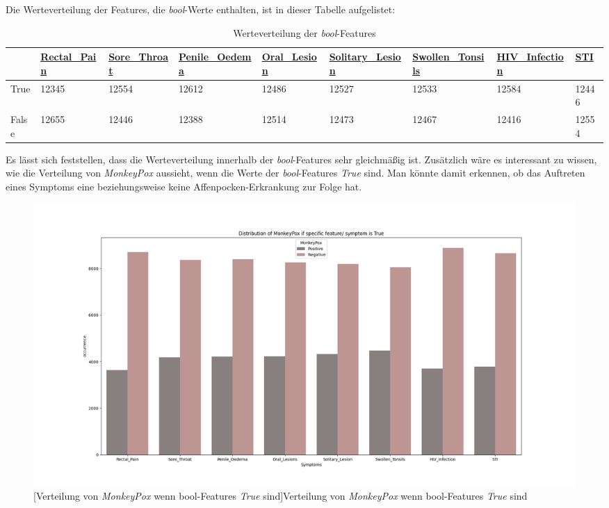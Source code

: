 \documentclass[13pt,a4paper, listof=entryprefix, bibliography=totocnumbered,toc=listofnumbered,lof=listofnumbered]{scrartcl}
\begin{document}
Die Werteverteilung der Features, die \textit{bool}-Werte enthalten, ist in dieser Tabelle aufgelistet: 
	
	\begin{singlespace}
	\begin{table}[H]
		\begin{adjustbox}{width=1\textwidth}
			\small
		\begin{tabular}{|l|l|l|l|l|l|l|l|l|}
			\hline  & \url{Rectal_Pain}&  \url{Sore_Throat}	& \url{Penile_Oedema} & \url{Oral_Lesion} & \url{Solitary_Lesion} &\url{Swollen_Tonsils} & \url{HIV_Infection} & \url{STI} \\
			\hline True & 12345 & 12554 & 12612 & 12486 & 12527 & 12533 & 12584  & 12446 \\
			\hline False & 12655 & 12446 & 12388& 12514 & 12473 & 12467 & 12416 & 12554\\
			\hline
		\end{tabular}
	\end{adjustbox}
		\caption{Werteverteilung der \textit{bool}-Features} %
		\label{tab:werteverteilung_features}
	\end{table}
\end{singlespace}
	

Es lässt sich feststellen, dass die Werteverteilung innerhalb der \textit{bool}-Features sehr gleichmäßig ist. 
Zusätzlich wäre es interessant zu wissen, wie die Verteilung von \textit{MonkeyPox} aussieht, wenn die Werte der \textit{bool}-Features
\textit{True} sind. Man könnte damit erkennen, ob das Auftreten eines Symptoms eine beziehungsweise keine Affenpocken-Erkrankung zur Folge hat.  

	\begin{figure}[H]
		\centering
		\includegraphics[width=0.8\linewidth]{Bilder/feature_plot_true.png}
		[Verteilung von \textit{MonkeyPox} wenn bool-Features \textit{True} sind]{Verteilung von \textit{MonkeyPox} wenn bool-Features \textit{True} sind}
		\label{fig:feature_true_plot}
	\end{figure}
\end{document}
